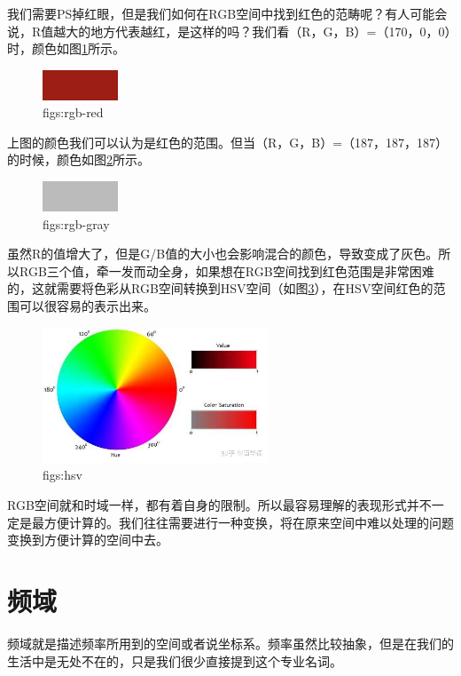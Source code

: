 \documentclass[lang=cn,11pt,a4paper,cite=numbers]{elegantpaper}
\begin{document}
  我们需要PS掉红眼，但是我们如何在RGB空间中找到红色的范畴呢？有人可能会说，R值越大的地方代表越红，是这样的吗？我们看（R，G，B）=（170，0，0）时，颜色如图\ref{figs:rgb-red}所示。
\begin{figure}[!htb]
  \centering
  \includegraphics[width=0.2\textwidth]{figs/rgb-red.png}
  \caption{figs:rgb-red}
  \label{figs:rgb-red}
\end{figure}

  上图的颜色我们可以认为是红色的范围。但当（R，G，B）=（187，187，187）的时候，颜色如图\ref{figs:rgb-gray}所示。
\begin{figure}[!htb]
  \centering
  \includegraphics[width=0.2\textwidth]{figs/rgb-gray.png}
  \caption{figs:rgb-gray}
  \label{figs:rgb-gray}
\end{figure}

  虽然R的值增大了，但是G/B值的大小也会影响混合的颜色，导致变成了灰色。所以RGB三个值，牵一发而动全身，如果想在RGB空间找到红色范围是非常困难的，这就需要将色彩从RGB空间转换到HSV空间（如图\ref{figs:hsv}），在HSV空间红色的范围可以很容易的表示出来。
\begin{figure}[!htb]
  \centering
  \includegraphics[width=0.6\textwidth]{figs/hsv.png}
  \caption{figs:hsv}
  \label{figs:hsv}
\end{figure}

  RGB空间就和时域一样，都有着自身的限制。所以最容易理解的表现形式并不一定是最方便计算的。我们往往需要进行一种变换，将在原来空间中难以处理的问题变换到方便计算的空间中去。

\section{频域}
  频域就是描述频率所用到的空间或者说坐标系。频率虽然比较抽象，但是在我们的生活中是无处不在的，只是我们很少直接提到这个专业名词。
\end{document}
